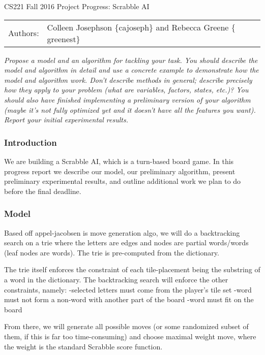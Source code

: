 \documentclass[12pt]{article}
\begin{document}
\begin{center}
{\Large CS221 Fall 2016 Project Progress: Scrabble AI}

\begin{tabular}{rl}
  Authors: & Colleen Josephson $\{$cajoseph$\}$ and Rebecca Greene $\{$greenest$\}$\\
\end{tabular}
\end{center}

\emph{Propose a model and an algorithm for tackling your task. You should
describe the model and algorithm in detail and use a concrete example
to demonstrate how the model and algorithm work. Don't describe
methods in general; describe precisely how they apply to your problem
(what are variables, factors, states, etc.)? You should also have
finished implementing a preliminary version of your algorithm (maybe
it's not fully optimized yet and it doesn't have all the features you
want). Report your initial experimental results.}


\subsubsection*{Introduction}
We are building a Scrabble AI, which is a turn-based board game. In
this progress report we describe our model, our preliminary algorithm,
present preliminary experimental results, and outline additional work
we plan to do before the final deadline.

\subsubsection*{Model}
Based off appel-jacobsen is move generation algo, we will do a
backtracking search on a trie where the letters are edges and nodes
are partial words/words (leaf nodes are words). The trie is
pre-computed from the dictionary.

The trie itself enforces the constraint of each tile-placement being
the substring of a word in the dictionary. The backtracking search
will enforce the other constraints, namely:
-selected letters must come from the player's tile set
-word must not form a non-word with another part of the board
-word must fit on the board

From there, we will generate all possible moves (or some randomized
subset of them, if this is far too time-consuming) and choose maximal
weight move, where the weight is the standard Scrabble score function.
\end{document}
